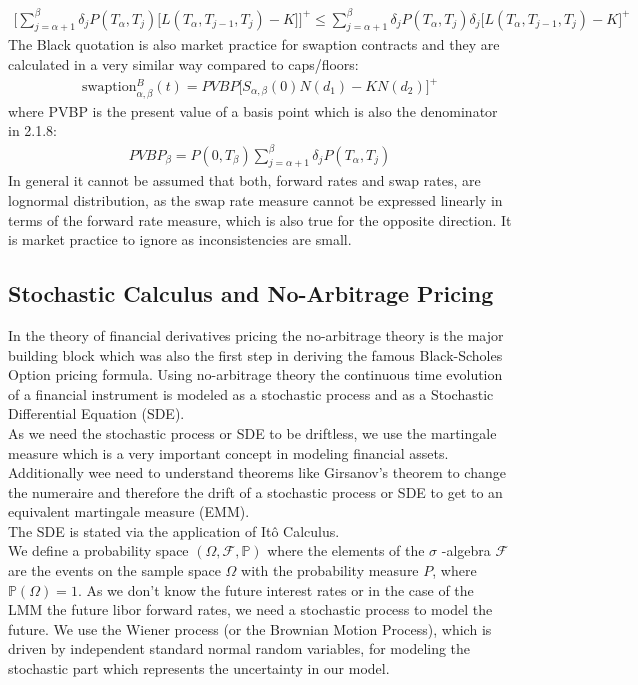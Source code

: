 \documentclass[11pt]{article}
\numberwithin{equation}{subsection}
\begin{document}
\begin{eqnarray*}
	\bigg[ \sum_{j=\alpha+1}^{\beta} \delta_{j} P(T_{\alpha}, T_{j}) \big[L(T_{\alpha}, T_{j-1}, T_{j})-K\big] \bigg]^{+} \leq  \sum_{j=\alpha+1}^{\beta} \delta_{j} P(T_{\alpha}, T_{j}) \delta_{j} \big[L(T_{\alpha}, T_{j-1}, T_{j})-K \big]^{+}
\end{eqnarray*}
The Black quotation is also market practice for swaption contracts and they are calculated in a very similar way compared to caps/floors:
\begin{eqnarray}
	\text{swaption}_{\alpha, \beta}^{B}(t) = PVBP\big[S_{\alpha, \beta}(0)N(d_1) -K N(d_2)\Big]^{+}
\end{eqnarray}
where PVBP is the present value of a basis point which is also the denominator in 2.1.8:
\begin{eqnarray*}
	PVBP_{\beta} = P(0, T_{\beta}) \sum_{j=\alpha+1}^{\beta} \delta_{j} P(T_{\alpha}, T_{j})
\end{eqnarray*}
In general it cannot be assumed that both, forward rates and swap rates, are lognormal distribution, as the swap rate measure cannot be expressed linearly in terms of the forward rate measure, which is also true for the opposite direction. It is market practice to ignore as inconsistencies are small.
\subsection{Stochastic Calculus and No-Arbitrage Pricing}
In the theory of financial derivatives pricing the no-arbitrage theory is the major building block which was also the first step in deriving the famous Black-Scholes Option pricing formula. Using no-arbitrage theory the continuous time evolution of a financial instrument is modeled as a stochastic process and as a Stochastic Differential Equation (SDE).\\ 
As we need the stochastic process or SDE to be driftless, we use the martingale measure which is a very important concept in modeling financial assets.\\
Additionally wee need to understand theorems like Girsanov's theorem to change the numeraire and therefore the drift of a stochastic process or SDE to get to an equivalent martingale measure (EMM).\\
The SDE is stated via the application of It\^{o} Calculus.\\
We define a probability space \((\Omega, \mathcal{F}, \mathbb{P})\) where the elements of the \(\sigma\) -algebra \(\mathcal{F}\) are the events on the sample space \(\Omega\) with the probability measure \(P\), where \(\mathbb{P}(\Omega)=1\). As we don't know the future interest rates or in the case of the LMM the future libor forward rates, we need a stochastic process to model the future. We use the Wiener process (or the Brownian Motion Process), which is driven by independent standard normal random variables, for modeling the stochastic part which represents the uncertainty in our model.
\end{document}
